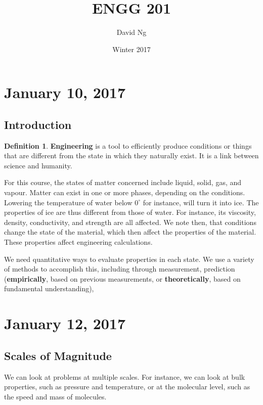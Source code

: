 \documentclass[11pt]{article}
\theoremstyle{plain} %
\theoremstyle{definition}
\newtheorem*{definition}{Definition} %
\theoremstyle{example}
\theoremstyle{remark}
\begin{document}
\title{ENGG 201}
\author{David Ng}
\date{Winter 2017}
\maketitle

\tableofcontents

\eject


\section{January 10, 2017}
\subsection{Introduction}
\begin{definition}
\textbf{Engineering} is a tool to efficiently produce conditions or things that are different from the state in which they naturally exist. It is a link between science and humanity. 
\end{definition}

For this course, the states of matter concerned include liquid, solid, gas, and vapour. Matter can exist in one or more phases, depending on the conditions. Lowering the temperature of water below $0^{\circ}$ for instance, will turn it into ice. The properties of ice are thus different from those of water. For instance, its viscosity, density, conductivity, and strength are all affected. We note then, that conditions change the state of the material, which then affect the properties of the material. These properties affect engineering calculations. 

We need quantitative ways to evaluate properties in each state. We use a variety of methods to accomplish this, including through measurement, prediction (\textbf{empirically}, based on previous measurements, or \textbf{theoretically}, based on fundamental understanding),  

\section{January 12, 2017}
\subsection{Scales of Magnitude}

We can look at problems at multiple scales. For instance, we can look at bulk properties, such as pressure and temperature, or at the molecular level, such as the speed and mass of molecules. 
\end{document}
